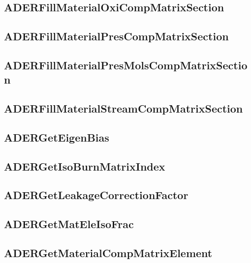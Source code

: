 \subsection{ADERFillMaterialOxiCompMatrixSection}


\subsection{ADERFillMaterialPresCompMatrixSection}


\subsection{ADERFillMaterialPresMolsCompMatrixSection}


\subsection{ADERFillMaterialStreamCompMatrixSection}


\subsection{ADERGetEigenBias}


\subsection{ADERGetIsoBurnMatrixIndex}


\subsection{ADERGetLeakageCorrectionFactor}


\subsection{ADERGetMatEleIsoFrac}


\subsection{ADERGetMaterialCompMatrixElement}


